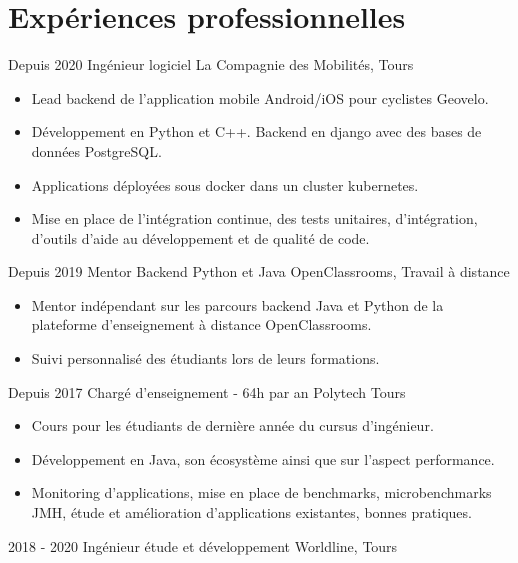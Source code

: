 \documentclass[]{friggeri-cv}
\begin{document}
\section{Expériences professionnelles}
\vspace{-5pt}
\begin{entrylist}
  \entry
  {Depuis 2020}
    {Ingénieur logiciel}
    {La Compagnie des Mobilités, Tours}
    {
    \vspace{-0.8\baselineskip}
	\begin{itemize}[leftmargin=*]
		\item Lead backend de l'application mobile Android/iOS pour cyclistes Geovelo.
		\item Développement en Python et C++. Backend en django avec des bases de données PostgreSQL.
		\item Applications déployées sous docker dans un cluster kubernetes.
		\item Mise en place de l'intégration continue, des tests unitaires, d'intégration, d'outils d'aide au développement et de qualité de code.
	\end{itemize}
	}
      \entry
    {Depuis 2019}
    {Mentor Backend Python et Java}
    {OpenClassrooms, Travail à distance}
    {
    \vspace{-0.8\baselineskip}
	\begin{itemize}[leftmargin=*]
		\item Mentor indépendant sur les parcours backend Java et Python de la plateforme d'enseignement à distance OpenClassrooms.
		\item Suivi personnalisé des étudiants lors de leurs formations.
	\end{itemize}
	}
  \entry
    {Depuis 2017}
    {Chargé d'enseignement - 64h par an}
    {Polytech Tours}
    {
    \vspace{-0.8\baselineskip}
	\begin{itemize}[leftmargin=*]
		\item Cours pour les étudiants de dernière année du cursus d'ingénieur.
		\item Développement en Java, son écosystème ainsi que sur l'aspect performance.
		\item Monitoring d'applications, mise en place de benchmarks, microbenchmarks JMH, étude et amélioration d'applications existantes, bonnes pratiques.
	\end{itemize}
	}
    \entry
    {2018 - 2020}
    {Ingénieur étude et développement}
    {Worldline, Tours}
    {
    \vspace{-0.8\baselineskip}
}
\end{entrylist}
\end{document}
